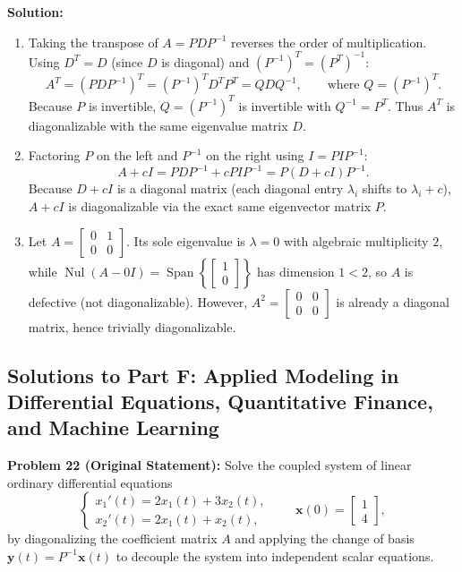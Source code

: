 \documentclass[11pt, letterpaper]{article}
\theoremstyle{definition}
\theoremstyle{remark}
\begin{document}
\textbf{Solution:}
\begin{enumerate}[label=(\alph*)]
    \item Taking the transpose of $A = PDP^{-1}$ reverses the order of multiplication. Using $D^{T} = D$ (since $D$ is diagonal) and $(P^{-1})^{T} = (P^{T})^{-1}$:
    \[
    A^{T} = (PDP^{-1})^{T} = (P^{-1})^{T} D^{T} P^{T} = Q D Q^{-1}, \qquad \text{where } Q = (P^{-1})^{T}.
    \]
    Because $P$ is invertible, $Q = (P^{-1})^{T}$ is invertible with $Q^{-1} = P^{T}$. Thus $A^{T}$ is diagonalizable with the same eigenvalue matrix $D$.

    \item Factoring $P$ on the left and $P^{-1}$ on the right using $I = PIP^{-1}$:
    \[
    A + cI = PDP^{-1} + cPIP^{-1} = P(D + cI)P^{-1}.
    \]
    Because $D + cI$ is a diagonal matrix (each diagonal entry $\lambda_{i}$ shifts to $\lambda_{i} + c$), $A + cI$ is diagonalizable via the exact same eigenvector matrix $P$.

    \item Let $A = \begin{bmatrix} 0 & 1 \\ 0 & 0 \end{bmatrix}$. Its sole eigenvalue is $\lambda = 0$ with algebraic multiplicity $2$, while $\operatorname{Nul}(A - 0I) = \operatorname{Span}\left\{\begin{bmatrix} 1 \\ 0 \end{bmatrix}\right\}$ has dimension $1 < 2$, so $A$ is defective (not diagonalizable). However, $A^{2} = \begin{bmatrix} 0 & 0 \\ 0 & 0 \end{bmatrix}$ is already a diagonal matrix, hence trivially diagonalizable.
\end{enumerate}

\subsection{Solutions to Part F: Applied Modeling in Differential Equations, Quantitative Finance, and Machine Learning}

\textbf{Problem 22 (Original Statement):}
Solve the coupled system of linear ordinary differential equations
\[
\begin{cases}
x_{1}'(t) = 2x_{1}(t) + 3x_{2}(t), \\
x_{2}'(t) = 2x_{1}(t) + x_{2}(t),
\end{cases}
\qquad \mathbf{x}(0) = \begin{bmatrix} 1 \\ 4 \end{bmatrix},
\]
by diagonalizing the coefficient matrix $A$ and applying the change of basis $\mathbf{y}(t) = P^{-1}\mathbf{x}(t)$ to decouple the system into independent scalar equations.
\end{document}
